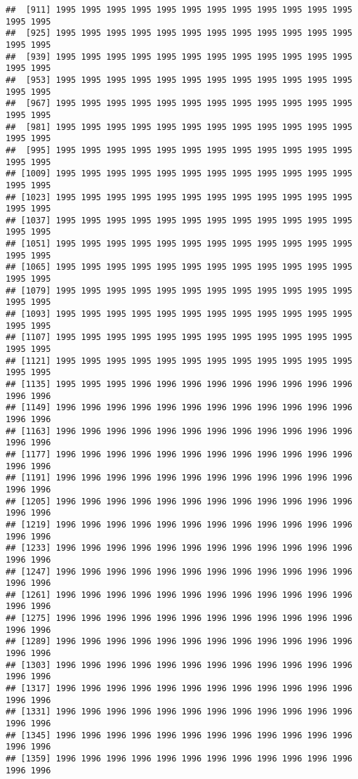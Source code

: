 \documentclass[
]{article}
\begin{document}
\begin{verbatim}
##  [911] 1995 1995 1995 1995 1995 1995 1995 1995 1995 1995 1995 1995 1995 1995
##  [925] 1995 1995 1995 1995 1995 1995 1995 1995 1995 1995 1995 1995 1995 1995
##  [939] 1995 1995 1995 1995 1995 1995 1995 1995 1995 1995 1995 1995 1995 1995
##  [953] 1995 1995 1995 1995 1995 1995 1995 1995 1995 1995 1995 1995 1995 1995
##  [967] 1995 1995 1995 1995 1995 1995 1995 1995 1995 1995 1995 1995 1995 1995
##  [981] 1995 1995 1995 1995 1995 1995 1995 1995 1995 1995 1995 1995 1995 1995
##  [995] 1995 1995 1995 1995 1995 1995 1995 1995 1995 1995 1995 1995 1995 1995
## [1009] 1995 1995 1995 1995 1995 1995 1995 1995 1995 1995 1995 1995 1995 1995
## [1023] 1995 1995 1995 1995 1995 1995 1995 1995 1995 1995 1995 1995 1995 1995
## [1037] 1995 1995 1995 1995 1995 1995 1995 1995 1995 1995 1995 1995 1995 1995
## [1051] 1995 1995 1995 1995 1995 1995 1995 1995 1995 1995 1995 1995 1995 1995
## [1065] 1995 1995 1995 1995 1995 1995 1995 1995 1995 1995 1995 1995 1995 1995
## [1079] 1995 1995 1995 1995 1995 1995 1995 1995 1995 1995 1995 1995 1995 1995
## [1093] 1995 1995 1995 1995 1995 1995 1995 1995 1995 1995 1995 1995 1995 1995
## [1107] 1995 1995 1995 1995 1995 1995 1995 1995 1995 1995 1995 1995 1995 1995
## [1121] 1995 1995 1995 1995 1995 1995 1995 1995 1995 1995 1995 1995 1995 1995
## [1135] 1995 1995 1995 1996 1996 1996 1996 1996 1996 1996 1996 1996 1996 1996
## [1149] 1996 1996 1996 1996 1996 1996 1996 1996 1996 1996 1996 1996 1996 1996
## [1163] 1996 1996 1996 1996 1996 1996 1996 1996 1996 1996 1996 1996 1996 1996
## [1177] 1996 1996 1996 1996 1996 1996 1996 1996 1996 1996 1996 1996 1996 1996
## [1191] 1996 1996 1996 1996 1996 1996 1996 1996 1996 1996 1996 1996 1996 1996
## [1205] 1996 1996 1996 1996 1996 1996 1996 1996 1996 1996 1996 1996 1996 1996
## [1219] 1996 1996 1996 1996 1996 1996 1996 1996 1996 1996 1996 1996 1996 1996
## [1233] 1996 1996 1996 1996 1996 1996 1996 1996 1996 1996 1996 1996 1996 1996
## [1247] 1996 1996 1996 1996 1996 1996 1996 1996 1996 1996 1996 1996 1996 1996
## [1261] 1996 1996 1996 1996 1996 1996 1996 1996 1996 1996 1996 1996 1996 1996
## [1275] 1996 1996 1996 1996 1996 1996 1996 1996 1996 1996 1996 1996 1996 1996
## [1289] 1996 1996 1996 1996 1996 1996 1996 1996 1996 1996 1996 1996 1996 1996
## [1303] 1996 1996 1996 1996 1996 1996 1996 1996 1996 1996 1996 1996 1996 1996
## [1317] 1996 1996 1996 1996 1996 1996 1996 1996 1996 1996 1996 1996 1996 1996
## [1331] 1996 1996 1996 1996 1996 1996 1996 1996 1996 1996 1996 1996 1996 1996
## [1345] 1996 1996 1996 1996 1996 1996 1996 1996 1996 1996 1996 1996 1996 1996
## [1359] 1996 1996 1996 1996 1996 1996 1996 1996 1996 1996 1996 1996 1996 1996

\end{verbatim}
\end{document}
